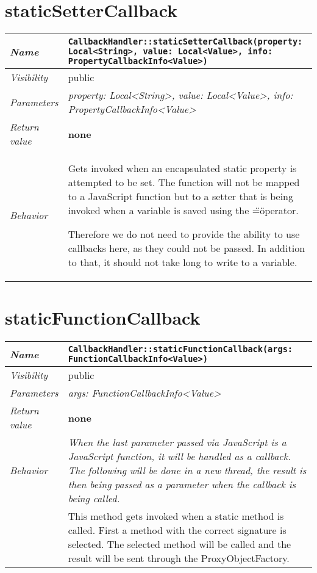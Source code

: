  \section{staticSetterCallback}
\begin{longtable}{p{3cm} @{\hskip 1cm} p{12cm}}
 \hline
\textit{Name} & \texttt{CallbackHandler::staticSetterCallback(property: Local<String>, value: Local<Value>, info: PropertyCallbackInfo<Value>)}\\
\hline
 \textit{Visibility} & public\\
\hline
\textit{Parameters} & \textit{property: Local<String>, value: Local<Value>, info: PropertyCallbackInfo<Value>}\\
\hline
\textit{Return value} & \textbf{none}\\
  \hline
 \textit{Behavior} & Gets invoked when an encapsulated static property is attempted to be set. The function will not be mapped to a JavaScript function but to a setter that is being invoked when a variable is saved using the \"=\" operator.

 Therefore we do not need to provide the ability to use callbacks here, as they could not be passed. In addition to that, it should not take long to write to a variable. \\
\hline
\end{longtable} \pagebreak
 \section{staticFunctionCallback}
\begin{longtable}{p{3cm} @{\hskip 1cm} p{12cm}}
 \hline
\textit{Name} & \texttt{CallbackHandler::staticFunctionCallback(args: FunctionCallbackInfo<Value>)}\\
\hline
 \textit{Visibility} & public\\
\hline
\textit{Parameters} & \textit{args: FunctionCallbackInfo<Value>}\\
\hline
\textit{Return value} & \textbf{none}\\
  \hline
 \textit{Behavior} & \textit{When the last parameter passed via JavaScript is a JavaScript function, it will be handled as a callback. The following will be done in a new thread, the result is then being passed as a parameter when the callback is being called.}\\

 & This method gets invoked when a static method is called. First a method with the correct signature is selected.
 The selected method will be called and the result will be sent through the ProxyObjectFactory. \\
\hline
\end{longtable} \pagebreak
